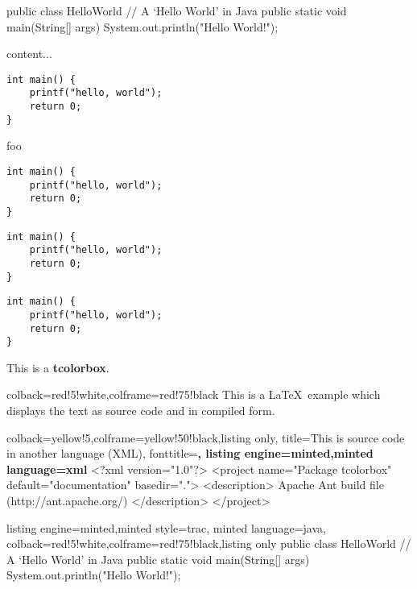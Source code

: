 \documentclass[10pt,a4paper]{article}
\begin{document}

		
\begin{myjava}
	public class HelloWorld {
		// A `Hello World' in Java
		public static void main(String[] args) {
			System.out.println("Hello World!");
		}
	}
\end{myjava}



\begin{listing}
	content...
\begin{verbatim}
int main() {
	printf("hello, world");
	return 0;
}
\end{verbatim}
\caption{foo}
\end{listing}


\begin{verbatim}
int main() {
	printf("hello, world");
	return 0;
}
\end{verbatim}

\begin{verbatim}
int main() {
	printf("hello, world");
	return 0;
}
\end{verbatim}

\begin{verbatim}
int main() {
	printf("hello, world");
	return 0;
}
\end{verbatim}


\begin{tcolorbox}
	This is a \textbf{tcolorbox}.
\end{tcolorbox}

\begin{tcblisting}{colback=red!5!white,colframe=red!75!black}
	This is a \LaTeX\ example which displays the text as source code
	and in compiled form.
\end{tcblisting}


\begin{tcblisting}{colback=yellow!5,colframe=yellow!50!black,listing only,
		title=This is source code in another language (XML), fonttitle=\bfseries,
		listing engine=minted,minted language=xml}
	<?xml version="1.0"?>
	<project name="Package tcolorbox" default="documentation" basedir=".">
	<description>
	Apache Ant build file (http://ant.apache.org/)
	</description>
	</project>
\end{tcblisting}

\begin{tcblisting}{listing engine=minted,minted style=trac,
	minted language=java,
	colback=red!5!white,colframe=red!75!black,listing only}
public class HelloWorld {
	// A `Hello World' in Java
	public static void main(String[] args) {
		System.out.println("Hello World!");
	}
}
\end{tcblisting}
\end{document}
